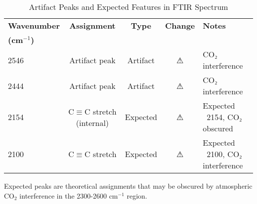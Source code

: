 \begin{table}[ht]
\centering
\caption{Artifact Peaks and Expected Features in FTIR Spectrum}
\label{tab:ftir_artifacts}
\begin{tabular}{lcccl}
\hline
\textbf{Wavenumber} & \textbf{Assignment} & \textbf{Type} & \textbf{Change} & \textbf{Notes} \\
\textbf{(cm$^{-1}$)} &  &  &  &  \\
\hline
2546 & Artifact peak & Artifact & ⚠ & CO₂ interference \\
2444 & Artifact peak & Artifact & ⚠ & CO₂ interference \\
2154 & C$\equiv$C stretch (internal) & Expected & ⚠ & Expected ~2154, CO₂ obscured \\
2100 & C$\equiv$C stretch & Expected & ⚠ & Expected ~2100, CO₂ interference \\
\hline
\end{tabular}
\begin{flushleft}
\footnotesize
Expected peaks are theoretical assignments that may be obscured by atmospheric CO$_2$ interference in the 2300-2600 cm$^{-1}$ region.
\end{flushleft}
\end{table}
